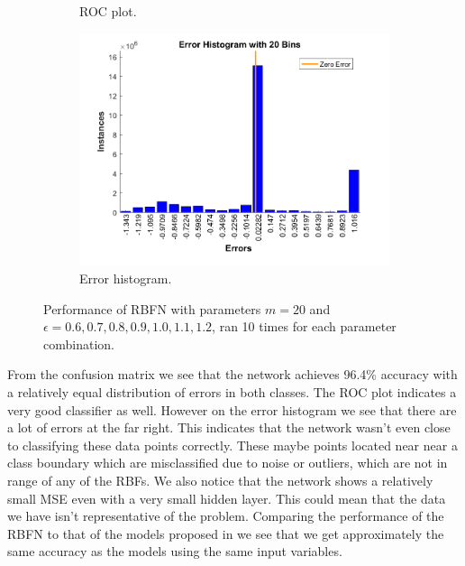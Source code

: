\documentclass[a4paper, 11pt]{article}
\begin{document}
\begin{figure}[h!]
\begin{subfigure}[t]{0.32\textwidth}
        \caption{ROC plot.}
        \label{fig:roc}
    \end{subfigure}
    \hfill %
    \begin{subfigure}[t]{0.32\textwidth}
        \includegraphics[width=\textwidth]{../figures/final/errhist.png}
        \caption{Error histogram.}
        \label{fig:errhist}
    \end{subfigure}
    \caption{Performance of RBFN with parameters $m = 20$ and $\epsilon = 0.6,0.7, 0.8, 0.9, 1.0, 1.1, 1.2$, ran 10  times for each parameter combination.}\label{fig:accuracy}
\end{figure}

From the confusion matrix we see that the network achieves 96.4\% accuracy with a relatively equal distribution of errors in both classes. The ROC plot indicates a very good classifier as well. However on the error histogram we see that there are a lot of errors at the far right. This indicates that the network wasn't even close to classifying these data points correctly. These maybe points located near near a class boundary which are misclassified due to noise or outliers, which are not in range of any of the RBFs. We also notice that the network shows a relatively small MSE even with a very small hidden layer. This could mean that the data we have isn't representative of the problem. Comparing the performance of the RBFN to that of the models proposed in \cite{Candanedo2016} we see that we get approximately the same accuracy as the models using the same input variables.
\end{document}
